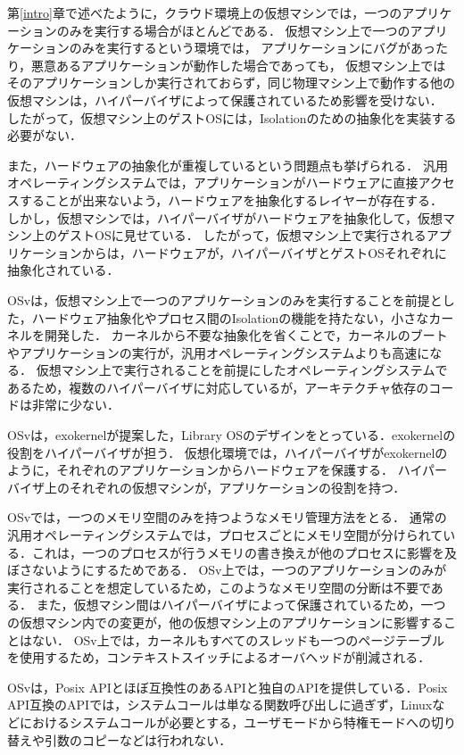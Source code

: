 \documentclass[graduation-thesis]{mlarticle}
\begin{document}
第\ref{intro}章で述べたように，クラウド環境上の仮想マシンでは，一つのアプリケーションのみを実行する場合がほとんどである．
仮想マシン上で一つのアプリケーションのみを実行するという環境では，
アプリケーションにバグがあったり，悪意あるアプリケーションが動作した場合であっても，
仮想マシン上ではそのアプリケーションしか実行されておらず，同じ物理マシン上で動作する他の仮想マシンは，ハイパーバイザによって保護されているため影響を受けない．
したがって，仮想マシン上のゲストOSには，Isolationのための抽象化を実装する必要がない．

また，ハードウェアの抽象化が重複しているという問題点も挙げられる．
汎用オペレーティングシステムでは，アプリケーションがハードウェアに直接アクセスすることが出来ないよう，ハードウェアを抽象化するレイヤーが存在する．
しかし，仮想マシンでは，ハイパーバイザがハードウェアを抽象化して，仮想マシン上のゲストOSに見せている．
したがって，仮想マシン上で実行されるアプリケーションからは，ハードウェアが，ハイパーバイザとゲストOSそれぞれに抽象化されている．

OSvは，仮想マシン上で一つのアプリケーションのみを実行することを前提とした，ハードウェア抽象化やプロセス間のIsolationの機能を持たない，小さなカーネルを開発した．
カーネルから不要な抽象化を省くことで，カーネルのブートやアプリケーションの実行が，汎用オペレーティングシステムよりも高速になる．
仮想マシン上で実行されることを前提にしたオペレーティングシステムであるため，複数のハイパーバイザに対応しているが，アーキテクチャ依存のコードは非常に少ない．

OSvは，exokernelが提案した，Library OSのデザインをとっている．exokernelの役割をハイパーバイザが担う．
仮想化環境では，ハイパーバイザがexokernelのように，それぞれのアプリケーションからハードウェアを保護する．
ハイパーバイザ上のそれぞれの仮想マシンが，アプリケーションの役割を持つ．

OSvでは，一つのメモリ空間のみを持つようなメモリ管理方法をとる．
通常の汎用オペレーティングシステムでは，プロセスごとにメモリ空間が分けられている．これは，一つのプロセスが行うメモリの書き換えが他のプロセスに影響を及ぼさないようにするためである．
OSv上では，一つのアプリケーションのみが実行されることを想定しているため，このようなメモリ空間の分断は不要である．
また，仮想マシン間はハイパーバイザによって保護されているため，一つの仮想マシン内での変更が，他の仮想マシン上のアプリケーションに影響することはない．
OSv上では，カーネルもすべてのスレッドも一つのページテーブルを使用するため，コンテキストスイッチによるオーバヘッドが削減される．

OSvは，Posix APIとほぼ互換性のあるAPIと独自のAPIを提供している．Posix API互換のAPIでは，システムコールは単なる関数呼び出しに過ぎず，Linuxなどにおけるシステムコールが必要とする，ユーザモードから特権モードへの切り替えや引数のコピーなどは行われない．
\end{document}
